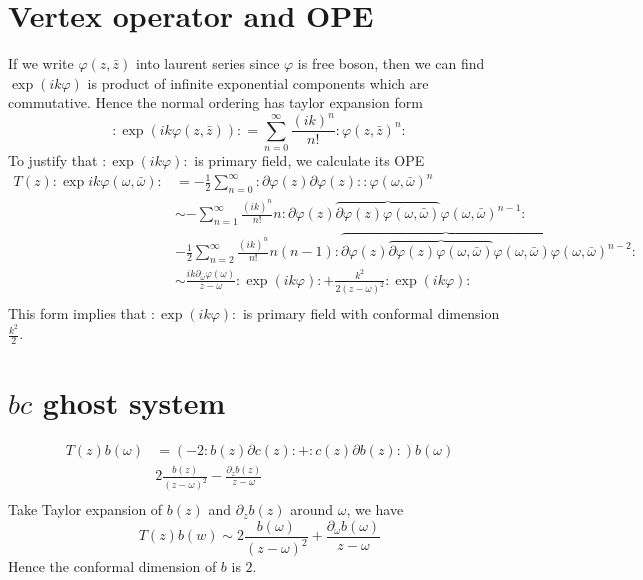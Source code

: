 \documentclass[11pt,a4paper]{article}
\theoremstyle{definition}
\begin{document}
\section{Vertex operator and OPE}
If we write $\varphi(z,\bar{z})$ into laurent series since $\varphi$ is free boson, then we can find $\exp(ik \varphi)$ is product of infinite exponential components which are commutative. Hence the normal ordering has taylor expansion form
\[
:\exp(ik \varphi(z,\bar{z})): = \sum_{n=0}^{\infty} \frac{(ik)^n}{n!}: \varphi(z,\bar{z})^n:
\]
To justify that $:\exp(ik \varphi):$ is primary field, we calculate its OPE
\[
\begin{aligned}
T(z):\exp{ik \varphi(\omega,\bar{\omega})}:& = - \frac{1}{2} \sum_{n=0}^{\infty} : \partial \varphi(z) \partial \varphi(z) :: \varphi(\omega, \bar{\omega})^n\\
&\sim - \sum_{n=1}^{\infty} \frac{(ik)^n}{n!} n : \partial \varphi(z) \overbrace{\partial \varphi(z) \varphi(\omega,\bar{\omega})} \varphi(\omega,\bar{\omega})^{n-1}:\\
&- \frac{1}{2}\sum_{n=2}^{\infty} \frac{(ik)^n}{n!} n(n-1) : \overbrace{\partial \varphi(z) \overbrace{\partial \varphi(z) \varphi(\omega, \bar{\omega})} \varphi(\omega,\bar{\omega})} \varphi(\omega,\bar{\omega})^{n-2}:\\
&\sim \frac{ik \partial_\omega \varphi(\omega)}{z-\omega}:\exp(ik\varphi): +\frac{k^2}{2(z-\omega)^2} :\exp(ik\varphi):\\
\end{aligned}
\]
This form implies that $:\exp(ik\varphi):$ is primary field with conformal dimension $\frac{k^2}{2}$.
\section{$bc$ ghost system}
 \[
 \begin{aligned}
 T(z) b(\omega) & = (-2: b(z) \partial c(z): + :c(z) \partial b(z):) b(\omega)\\
 & 2 \frac{b(z)}{(z-\omega)^2} - \frac{\partial_z b(z)}{z-\omega}\\
 \end{aligned}
 \]
 Take Taylor expansion of $b(z)$ and $\partial_z b(z)$ around $\omega$, we have
 \[
 T(z)b(w) \sim 2\frac{b(\omega)}{(z-\omega)^2} + \frac{\partial_\omega b(\omega)}{z-\omega}
 \]
 Hence the conformal dimension of $b$ is $2$.
 
\end{document}
